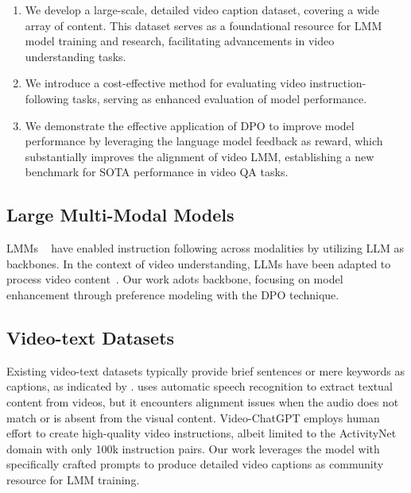 \begin{enumerate}
\item We develop a large-scale, detailed video caption dataset, covering a wide array of content. This dataset serves as a foundational resource for LMM model training and research, facilitating advancements in video understanding tasks.
    \item We introduce a cost-effective method for evaluating video instruction-following tasks, serving as enhanced evaluation of model performance. 
    \item We demonstrate the effective application of DPO to improve model performance by leveraging the language model feedback as reward, which substantially improves the alignment of video LMM, establishing a new benchmark for SOTA performance in video QA tasks.
\end{enumerate}

\subsection{Large Multi-Modal Models}
LMMs ~\citep{liu2023visual, liu2023improved, bai2023qwen, chen2023shikra, li2023blip} have enabled instruction following across modalities by utilizing LLM as backbones. In the context of video understanding, LLMs have been adapted to process video content~\citep{lin2023videollava, zhang2023video, maaz2023video, li2023videochat, luo2023valley, liu2023one, jin2024video, ahn2024tuning}. Our work adots \videollava backbone, focusing on model enhancement through preference modeling with the DPO technique.

\subsection{Video-text Datasets}
Existing video-text datasets typically provide brief sentences or mere keywords as captions, as indicated by \cite{bain2021frozen, wang2023internvid, yu2019activitynet, jang2017tgif, xu2016msr}. \cite{shvetsova2023howtocaption} uses automatic speech recognition to extract textual content from videos, but it encounters alignment issues when the audio does not match or is absent from the visual content. Video-ChatGPT \citep{li2023videochat} employs human effort to create high-quality video instructions, albeit limited to the ActivityNet domain with only 100k instruction pairs. Our work leverages the \gptv model with specifically crafted prompts to produce detailed video captions as community resource for LMM training.

